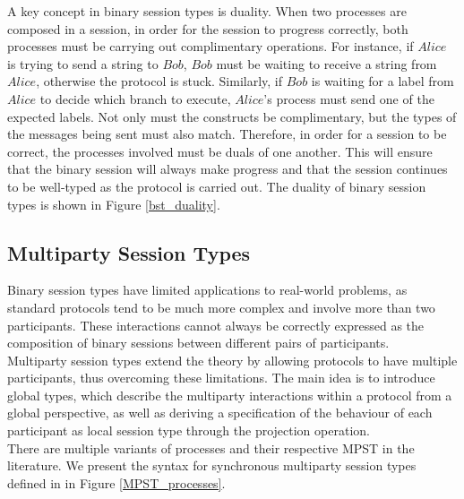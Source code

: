 \documentclass[12pt,twoside]{report}
\begin{document}
A key concept in binary session types is duality. When two processes are composed in a session, in order for the session to progress correctly, both processes must be carrying out complimentary operations. For instance, if $Alice$ is trying to send a string to $Bob$, $Bob$ must be waiting to receive a string from $Alice$, otherwise the protocol is stuck. Similarly, if $Bob$ is waiting for a label from $Alice$ to decide which branch to execute, $Alice$'s process must send one of the expected labels. Not only must the constructs be complimentary, but the types of the messages being sent must also match. Therefore, in order for a session to be correct, the processes involved must be duals of one another. This will ensure that the binary session will always make progress and that the session continues to be well-typed as the protocol is carried out. The duality of binary session types is shown in Figure \ref{bst_duality}.



\subsection{Multiparty Session Types}\label{multiparty-session-types}
Binary session types have limited applications to real-world problems, as standard protocols tend to be much more complex and involve more than two participants. These interactions cannot always be correctly expressed as the composition of binary sessions between different pairs of participants. \\

Multiparty session types\cite{asyncmpst2} extend the theory by allowing protocols to have multiple participants, thus overcoming these limitations. The main idea is to introduce global types, which describe the multiparty interactions within a protocol from a global perspective, as well as deriving a specification of the behaviour of each participant as local session type through the projection operation. \\

There are multiple variants of processes and their respective MPST in the literature. We present the syntax for synchronous multiparty session types defined in \cite{verygentleintrotompst} in Figure \ref{MPST_processes}.
\end{document}
